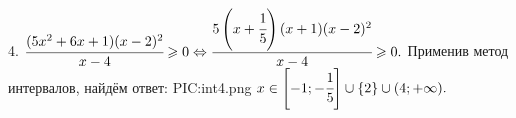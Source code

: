 4. $\cfrac{(5x^2+6x+1)(x-2)^2}{x-4}\geqslant0\Leftrightarrow\cfrac{5\left(x+\cfrac{1}{5}\right)(x+1)(x-2)^2}{x-4}\geqslant0.$ Применив метод интервалов, найдём ответ:
{{PIC:int4.png}}
$x\in\left[-1;-\cfrac{1}{5}\right]\cup\{2\}\cup(4;+\infty).$\newpage\noindent
